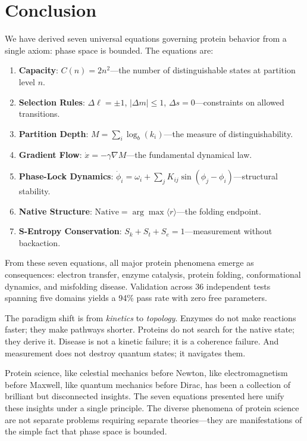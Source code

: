 \documentclass[aps,prx,superscriptaddress,twocolumn,10pt,a4paper,longbibliography,preprint]{revtex4-2}
\newcommand{\orderp}{\langle r \rangle}
\theoremstyle{definition}
\theoremstyle{remark}
\begin{document}
\section{Conclusion}
\label{sec:conclusion}

We have derived seven universal equations governing protein behavior from a single axiom: phase space is bounded. The equations are:

\begin{enumerate}
\item \textbf{Capacity}: $C(n) = 2n^2$---the number of distinguishable states at partition level $n$.
\item \textbf{Selection Rules}: $\Delta\ell = \pm 1$, $|\Delta m| \leq 1$, $\Delta s = 0$---constraints on allowed transitions.
\item \textbf{Partition Depth}: $M = \sum_i \log_b(k_i)$---the measure of distinguishability.
\item \textbf{Gradient Flow}: $\dot{x} = -\gamma \nabla M$---the fundamental dynamical law.
\item \textbf{Phase-Lock Dynamics}: $\dot{\phi}_i = \omega_i + \sum_j K_{ij}\sin(\phi_j - \phi_i)$---structural stability.
\item \textbf{Native Structure}: $\text{Native} = \arg\max \orderp$---the folding endpoint.
\item \textbf{S-Entropy Conservation}: $S_k + S_t + S_e = 1$---measurement without backaction.
\end{enumerate}

From these seven equations, all major protein phenomena emerge as consequences: electron transfer, enzyme catalysis, protein folding, conformational dynamics, and misfolding disease. Validation across 36 independent tests spanning five domains yields a 94\% pass rate with zero free parameters.

The paradigm shift is from \emph{kinetics} to \emph{topology}. Enzymes do not make reactions faster; they make pathways shorter. Proteins do not search for the native state; they derive it. Disease is not a kinetic failure; it is a coherence failure. And measurement does not destroy quantum states; it navigates them.

Protein science, like celestial mechanics before Newton, like electromagnetism before Maxwell, like quantum mechanics before Dirac, has been a collection of brilliant but disconnected insights. The seven equations presented here unify these insights under a single principle. The diverse phenomena of protein science are not separate problems requiring separate theories---they are manifestations of the simple fact that phase space is bounded.
\end{document}

